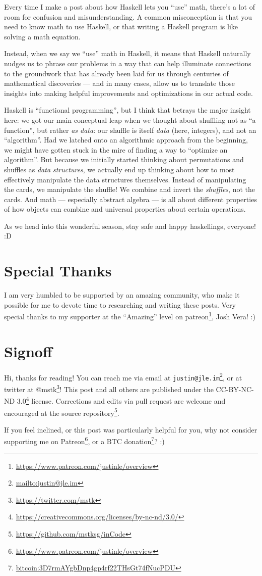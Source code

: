 \documentclass[]{article}
\renewcommand{\href}[2]{#2\footnote{\url{#1}}}
\begin{document}
Every time I make a post about how Haskell lets you ``use'' math, there's a lot
of room for confusion and misunderstanding. A common misconception is that you
need to know math to use Haskell, or that writing a Haskell program is like
solving a math equation.

Instead, when we say we ``use'' math in Haskell, it means that Haskell naturally
nudges us to phrase our problems in a way that can help illuminate connections
to the groundwork that has already been laid for us through centuries of
mathematical discoveries --- and in many cases, allow us to translate those
insights into making helpful improvements and optimizations in our actual code.

Haskell is ``functional programming'', but I think that betrays the major
insight here: we got our main conceptual leap when we thought about shuffling
not as ``a function'', but rather \emph{as data}: our shuffle is itself
\emph{data} (here, integers), and not an ``algorithm''. Had we latched onto an
algorithmic approach from the beginning, we might have gotten stuck in the mire
of finding a way to ``optimize an algorithm''. But because we initially started
thinking about permutations and shuffles as \emph{data structures}, we actually
end up thinking about how to most effectively manipulate the data structures
themselves. Instead of manipulating the cards, we manipulate the shuffle! We
combine and invert the \emph{shuffles}, not the cards. And math --- especially
abstract algebra --- is all about different properties of how objects can
combine and universal properties about certain operations.

As we head into this wonderful season, stay safe and happy haskellings,
everyone! :D

\hypertarget{special-thanks}{%
\section{Special Thanks}\label{special-thanks}}

I am very humbled to be supported by an amazing community, who make it possible
for me to devote time to researching and writing these posts. Very special
thanks to my supporter at the ``Amazing'' level on
\href{https://www.patreon.com/justinle/overview}{patreon}, Josh Vera! :)

\hypertarget{signoff}{%
\section{Signoff}\label{signoff}}

Hi, thanks for reading! You can reach me via email at
\href{mailto:justin@jle.im}{\nolinkurl{justin@jle.im}}, or at twitter at
\href{https://twitter.com/mstk}{@mstk}! This post and all others are published
under the \href{https://creativecommons.org/licenses/by-nc-nd/3.0/}{CC-BY-NC-ND
3.0} license. Corrections and edits via pull request are welcome and encouraged
at \href{https://github.com/mstksg/inCode}{the source repository}.

If you feel inclined, or this post was particularly helpful for you, why not
consider \href{https://www.patreon.com/justinle/overview}{supporting me on
Patreon}, or a \href{bitcoin:3D7rmAYgbDnp4gp4rf22THsGt74fNucPDU}{BTC donation}?
:)
\end{document}
